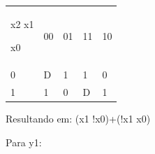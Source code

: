 \documentclass{article}
\begin{document}
\begin{table}[h]
 \centering
 {\renewcommand\arraystretch{1.25}
 \begin{tabular}{ l l l l l }
  \cline{1-1}\cline{2-2}\cline{3-3}\cline{4-4}\cline{5-5}  
    \multicolumn{1}{|p{1.300cm}|}{\begin{center}x2 x1
\end{center}  			


\begin{center}x0
\end{center}} &
    \multicolumn{1}{p{0.700cm}|}{00 \centering } &
    \multicolumn{1}{p{0.700cm}|}{01 \centering } &
    \multicolumn{1}{p{0.700cm}|}{11 \centering } &
    \multicolumn{1}{p{0.650cm}|}{10 \centering }
  \\  
  \cline{1-1}\cline{2-2}\cline{3-3}\cline{4-4}\cline{5-5}  
    \multicolumn{1}{|p{1.300cm}|}{0 \centering } &
    \multicolumn{1}{p{0.700cm}|}{D \centering } &
    \multicolumn{1}{p{0.700cm}|}{1 \centering } &
    \multicolumn{1}{p{0.700cm}|}{1 \centering } &
    \multicolumn{1}{p{0.650cm}|}{0 \centering }
  \\  
  \cline{1-1}\cline{2-2}\cline{3-3}\cline{4-4}\cline{5-5}  
    \multicolumn{1}{|p{1.300cm}|}{1 \centering } &
    \multicolumn{1}{p{0.700cm}|}{1 \centering } &
    \multicolumn{1}{p{0.700cm}|}{0 \centering } &
    \multicolumn{1}{p{0.700cm}|}{D \centering } &
    \multicolumn{1}{p{0.650cm}|}{1 \centering }
  \\  
  \hline

 \end{tabular} }
\end{table}

Resultando em: (x1 !x0)+(!x1 x0)

Para y1:
\end{document}
